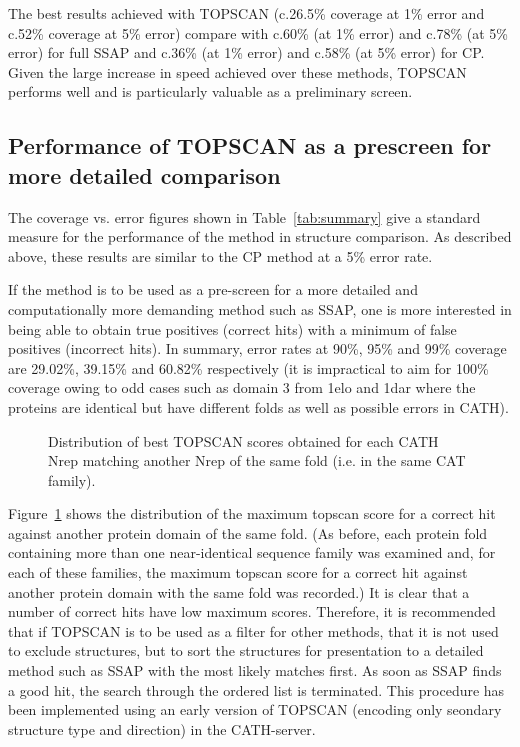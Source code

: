\documentclass{article}
\begin{document}
The best results achieved with TOPSCAN (c.26.5\% coverage at 1\% error
and c.52\% coverage at 5\% error) compare with c.60\% (at 1\% error)
and c.78\% (at 5\% error) for full SSAP and c.36\% (at 1\% error) and
c.58\% (at 5\% error) for CP\cite{gilbert:aisb}. Given the large
increase in speed achieved over these methods, TOPSCAN performs well
and is particularly valuable as a preliminary screen.

\subsection{Performance of TOPSCAN as a prescreen for more detailed
comparison} 

The coverage vs. error figures shown in Table~\ref{tab:summary} give a
standard measure for the performance of the method in structure
comparison. As described above, these results are similar to the CP
method at a 5\% error rate.

If the method is to be used as a pre-screen for a more detailed and
computationally more demanding method such as SSAP, one is more
interested in being able to obtain true positives (correct hits) with
a minimum of false positives (incorrect hits). In summary, error rates
at 90\%, 95\% and 99\% coverage are 29.02\%, 39.15\% and 60.82\%
respectively (it is impractical to aim for 100\% coverage owing to odd
cases such as domain 3 from 1elo and 1dar where the proteins are
identical but have different folds as well as possible errors in
CATH).

\begin{figure}
\centerline{}
\caption{\label{fig:cutoffs}Distribution of best TOPSCAN scores
obtained for each CATH Nrep matching another Nrep of the same fold
(i.e. in the same CAT family).}
\end{figure}

Figure~\ref{fig:cutoffs} shows the distribution of the maximum topscan
score for a correct hit against another protein domain of the same fold.
(As before, each protein fold containing more than one near-identical
sequence family was examined and, for each of these families, the maximum
topscan score for a correct hit against another protein domain with
the same fold was recorded.) It is clear that a number of correct hits
have low maximum scores. Therefore, it is recommended that if
TOPSCAN is to be used as a filter for other methods, that it is not
used to exclude structures, but to sort the structures for
presentation to a detailed method such as SSAP with the most likely
matches first. As soon as SSAP finds a good hit, the search through
the ordered list is terminated. This procedure has been implemented
using an early version of TOPSCAN (encoding only seondary structure
type and direction) in the CATH-server\cite{orengo:classifying}.
\end{document}
